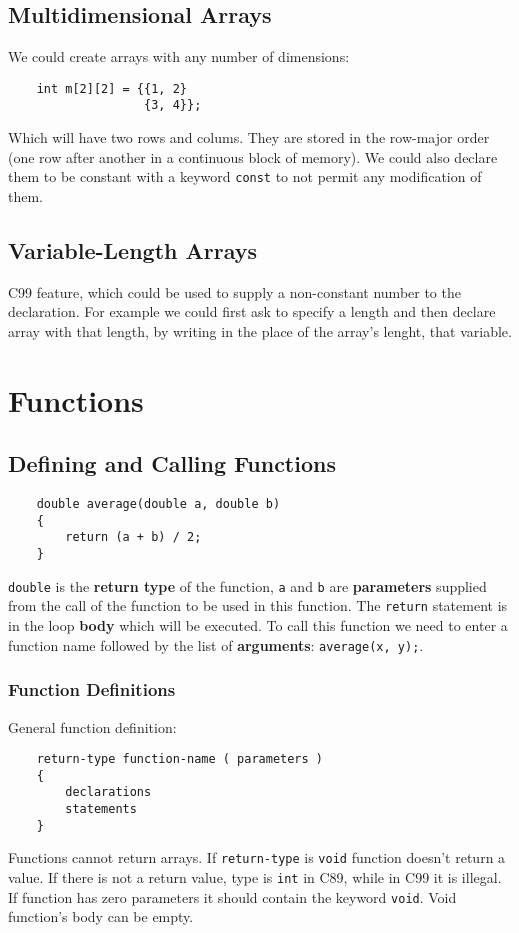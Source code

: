 \documentclass[openany]{book}
\begin{document}
    \section{Multidimensional Arrays}
    We could create arrays with any number of dimensions:
    \begin{lstlisting}
    int m[2][2] = {{1, 2}
                   {3, 4}};
    \end{lstlisting}
    Which will have two rows and colums. They are stored in the row-major order (one row after another in a continuous block of memory). We could also declare them to be constant with a keyword \texttt{const} to not permit any modification of them.

    \section{Variable-Length Arrays}
    C99 feature, which could be used to supply a non-constant number to the declaration. For example we could first ask to specify a length and then declare array with that length, by writing in the place of the array's lenght, that variable.



    \chapter{Functions}

    \section{Defining and Calling Functions}
    \begin{lstlisting}
    double average(double a, double b)
    {
        return (a + b) / 2;
    }
    \end{lstlisting}
    \texttt{double} is the \textbf{return type} of the function, \texttt{a} and \texttt{b} are \textbf{parameters} supplied from the call of the function to be used in this function. The \texttt{return} statement is in the loop \textbf{body} which will be executed. To call this function we need to enter a function name followed by the list of \textbf{arguments}: \texttt{average(x, y);}.

    \subsection{Function Definitions}
    General function definition:
    \begin{lstlisting}
    return-type function-name ( parameters )
    {
        declarations
        statements
    }
    \end{lstlisting}
    Functions cannot return arrays. If \texttt{return-type} is \texttt{void} function doesn't return a value. If there is not a return value, type is \texttt{int} in C89, while in C99 it is illegal. If function has zero parameters it should contain the keyword \texttt{void}. Void function's body can be empty.
\end{document}

